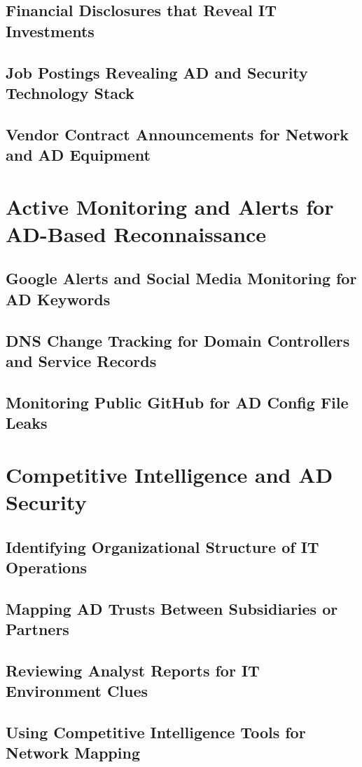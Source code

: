 \documentclass{article}
\begin{document}
\subsection{Financial Disclosures that Reveal IT Investments}
\subsection{Job Postings Revealing AD and Security Technology Stack}
\subsection{Vendor Contract Announcements for Network and AD Equipment}
\section{Active Monitoring and Alerts for AD-Based Reconnaissance}
\subsection{Google Alerts and Social Media Monitoring for AD Keywords}
\subsection{DNS Change Tracking for Domain Controllers and Service Records}
\subsection{Monitoring Public GitHub for AD Config File Leaks}
\section{Competitive Intelligence and AD Security}
\subsection{Identifying Organizational Structure of IT Operations}
\subsection{Mapping AD Trusts Between Subsidiaries or Partners}
\subsection{Reviewing Analyst Reports for IT Environment Clues}
\subsection{Using Competitive Intelligence Tools for Network Mapping}
\end{document}
